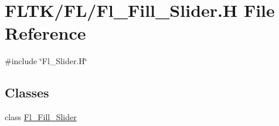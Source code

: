 \hypertarget{_fl___fill___slider_8_h}{}\section{F\+L\+T\+K/\+F\+L/\+Fl\+\_\+\+Fill\+\_\+\+Slider.H File Reference}
\label{_fl___fill___slider_8_h}
{\ttfamily \#include \char`\"{}Fl\+\_\+\+Slider.\+H\char`\"{}}\newline
\subsection*{Classes}
\begin{DoxyCompactItemize}
\item 
class \hyperlink{class_fl___fill___slider}{Fl\+\_\+\+Fill\+\_\+\+Slider}
\end{DoxyCompactItemize}

